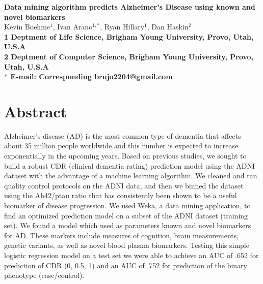 \documentclass[10pt]{article}
\date{}
\begin{document}



\begin{flushleft}
{\Large
\textbf{Data mining algorithm predicts Alzheimer's Disease using known and novel biomarkers}
}
\\
Kevin Boehme$^{1}$,
Ivan Arano$^{1,\ast}$,
Ryan Hillary$^{1}$,
Dan Haskin$^{2}$ 
\\
\bf{1} Deptment of Life Science, Brigham Young University, Provo, Utah, U.S.A \\
\bf{2} Deptment of Computer Science, Brigham Young University, Provo, Utah, U.S.A
\\
$\ast$ E-mail: Corresponding brujo2204@gmail.com
\end{flushleft}

\section*{Abstract}
Alzheimer's disease (AD) is the most common type of dementia that affects about 35 million people worldwide and this number is expected to increase exponentially in the upcoming years. Based on previous studies, we sought to build a robust CDR (clinical dementia rating) prediction model using the ADNI dataset with the advantage of a machine learning algorithm.  We cleaned and ran quality control protocols on the ADNI data, and then we binned the dataset using the Ab42/ptau ratio that has consistently been shown to be a useful biomarker of disease progression.  We used Weka, a data mining application, to find an optimized prediction model on a subset of the ADNI dataset (training set).  We found a model which used as parameters known and novel biomarkers for AD.  These markers include measures of cognition, brain measurements, genetic variants, as well as novel blood plasma biomarkers.  Testing this simple logistic regression model on a test set we were able to achieve an AUC of .652 for prediction of CDR (0, 0.5, 1) and an AUC of .752 for prediction of the binary phenotype (case/control).  
\end{document}

